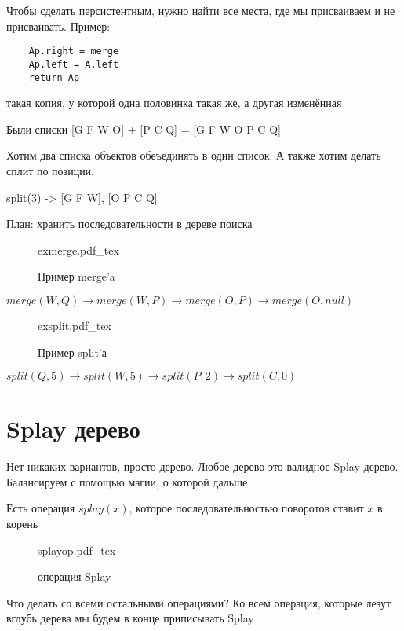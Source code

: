\documentclass{book}
\theoremstyle{definition}
\newcommand{\incfig}[1]{%
    \def\svgwidth{\columnwidth}
    {#1.pdf_tex}
}
\begin{document}
Чтобы сделать персистентным, нужно найти все места, где мы присваиваем и не присваивать.
Пример:
\begin{lstlisting}
    Ap.right = merge
    Ap.left = A.left
    return Ap
\end{lstlisting}

такая копия, у которой одна половинка такая же, а другая изменённая

\begin{remember}
    Были списки [G F W O] + [P C Q] = [G F W O P C Q]

    Хотим два списка объектов обеъединять в один список. А также хотим делать сплит по позиции.

    split(3) -> [G F W], [O P C Q]
\end{remember}

План: хранить последовательности в дереве поиска 

\begin{figure}[!ht]
    \centering
    \incfig{exmerge}
    \caption{Пример merge'a}
    \label{fig:exmerge}
\end{figure}

$merge\left( W, Q \right)  \to merge\left( W, P \right) \to merge\left( O, P \right) \to merge\left( O, null \right) $

\begin{figure}[!ht]
    \centering
    \incfig{exsplit}
    \caption{Пример split'а}
    \label{fig:exsplit}
\end{figure}

$split\left( Q, 5 \right)  \to split\left( W, 5 \right)  \to  split\left( P, 2 \right) \to split\left( C, 0 \right) $


\section{Splay дерево}

Нет никаких вариантов, просто дерево. Любое дерево это валидное Splay дерево. Балансируем с помощью магии, о которой дальше

Есть операция $splay(x)$, которое последовательностью поворотов ставит $x$ в корень

\begin{figure}[!ht]
    \centering
    \incfig{splayop}
    \caption{операция Splay}
    \label{fig:splayop}
\end{figure}

Что делать со всеми остальными операциями? Ко всем операция, которые лезут вглубь дерева мы будем в конце приписывать Splay
\end{document}
